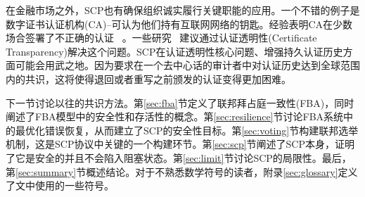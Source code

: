 在金融市场之外，SCP也有确保组织诚实履行关键职能的应用。一个不错的例子是数字证书认证机构(CA)--可认为他们持有互联网网络的钥匙。经验表明CA在少数场合签署了不正确的认证~ 。一些研究~ 建议通过认证透明性(Certificate Transparency)解决这个问题。SCP在认证透明性核心问题、增强持久认证历史方面可能会用武之地。因为要求在一个去中心话的审计者中对认证历史达到全球范围内的共识，这将使得退回或者重写之前颁发的认证变得更加困难。

下一节讨论以往的共识方法。第\ref{sec:fba}节定义了联邦拜占庭一致性(FBA)，同时阐述了FBA模型中的安全性和存活性的概念。第\ref{sec:resilience}节讨论FBA系统中的最优化错误恢复，从而建立了SCP的安全性目标。第\ref{sec:voting}节构建联邦选举机制，这是SCP协议中关键的一个构建环节。第\ref{sec:scp}节阐述了SCP本身，证明了它是安全的并且不会陷入阻塞状态。第\ref{sec:limit}节讨论SCP的局限性。最后，第\ref{sec:summary}节概述结论。对于不熟悉数学符号的读者，附录\ref{sec:glossary}定义了文中使用的一些符号。